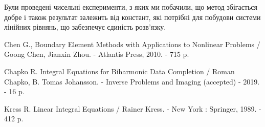 \documentclass[12pt]{report}
\begin{document}
Були проведені чисельні експерименти, з яких ми побачили, що метод збігається добре і також результат залежить від констант, які потрібні для побудови системи лінійних рівнянь, що забезпечує єдиність розв'язку.
\newpage

\begin{thebibliography}{99}
Chen G., Boundary Element Methods with Applications to Nonlinear Problems / Goong Chen, Jianxin Zhou. - Atlantis Press, 2010. - 715 p.

Chapko R. Integral Equations for Biharmonic Data Completion / Roman Chapko, B. Tomas Johansson. - Inverse Problems and Imaging (accepted) - 2019. - 16 p.
 
Kress R. Linear Integral Equations / Rainer Kress. - New York : Springer, 1989. - 412 p.

\end{thebibliography}
\end{document}

